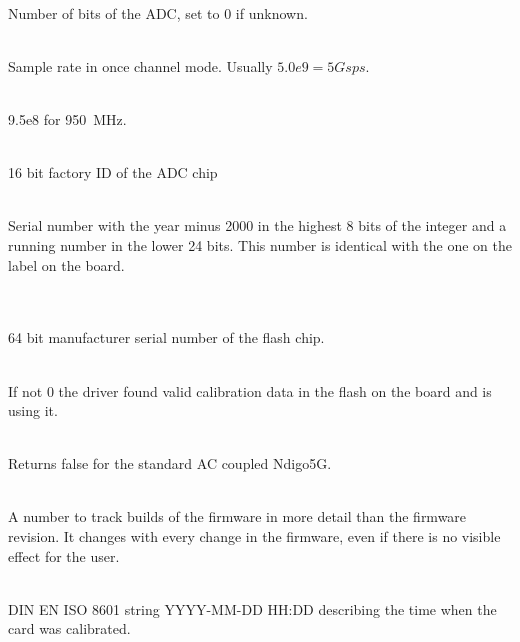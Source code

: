             \\
            Number of bits of the ADC, set to 0 if unknown.\par

            \\
            Sample rate in once channel mode. Usually $5.0e9 = 5 Gsps$.\par

            \\
            9.5e8 for \SI{950}{\MHz}.

            \\
            16 bit factory ID of the ADC chip\par

            \\
            Serial number with the year minus 2000 in the highest 8 bits of the integer and a running number in the lower 24 bits. This number is identical with the one on the label on the board.\par

            \\
            \\
            64 bit manufacturer serial number of the flash chip.\par

            \\
            If not 0 the driver found valid calibration data in the flash on the board and is using it.\par

            \\
            Returns false for the standard AC coupled Ndigo5G.\par

            \\
            A number to track builds of the firmware in more detail than the firmware revision. It changes with every change in the firmware, even if there is no visible effect for the user.\par

            \\
            DIN EN ISO 8601 string YYYY-MM-DD HH:DD describing the time when the card was calibrated.

